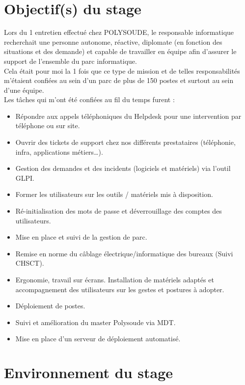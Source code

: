 \documentclass[11pt,a4paper,oneside]{article}
\begin{document}
\newpage
\section{Objectif(s) du stage}

Lors du 1\ier{} entretien effectué chez POLYSOUDE, le responsable informatique recherchait une personne autonome, réactive, diplomate (en fonction des situations et des demande) et capable de travailler en équipe afin d’assurer le support de l’ensemble du parc informatique.\\

Cela était pour moi la 1\ier{} fois que ce type de mission et de telles responsabilités m’étaient confiées au sein d’un parc de plus de 150 postes et surtout au sein d’une équipe.\\

Les tâches qui m’ont été confiées au fil du temps furent : \\
\begin{itemize}
    \item Répondre aux appels téléphoniques du Helpdesk pour une intervention par téléphone ou sur site.
    \item Ouvrir des tickets de support chez nos différents prestataires (téléphonie, infra, applications métiers…).
    \item Gestion des demandes et des incidents (logiciels et matériels) via l’outil GLPI.
    \item Former les utilisateurs sur les outils / matériels mis à disposition.
    \item Ré-initialisation des mots de passe et déverrouillage des comptes des     utilisateurs.
    \item Mise en place et suivi de la gestion de parc.
    \item Remise en norme du câblage électrique/informatique des bureaux (Suivi CHSCT). 
    \item Ergonomie, travail sur écrans. Installation de matériels adaptés et accompagnement des utilisateurs sur les gestes et postures à adopter. 
    \item Déploiement de postes.
    \item Suivi et amélioration du master Polysoude via MDT.
    \item Mise en place d’un serveur de déploiement automatisé.

\end{itemize}

\newpage
\section{Environnement du stage}
\end{document}
